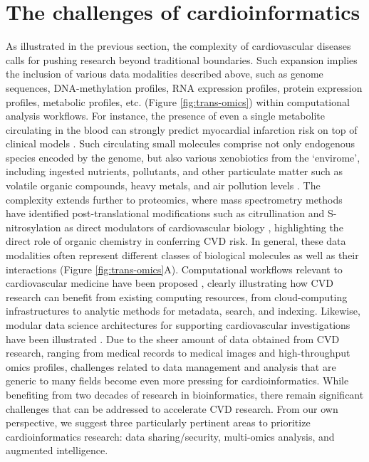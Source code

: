 \documentclass[letter]{bioinfo}
\begin{document}
	\section*{The challenges of cardioinformatics}
	As illustrated in the previous section, the complexity of cardiovascular diseases calls for pushing research beyond traditional boundaries.
	Such expansion implies the inclusion of various data modalities described above, such as genome sequences, DNA-methylation profiles, RNA expression profiles, protein expression profiles, metabolic profiles, etc. (Figure \ref{fig:trans-omics}) within computational analysis workflows.  For instance, the presence of even a single metabolite circulating in the blood can strongly predict myocardial infarction risk on top of clinical models \citep{mcgarrah:2018:cardiovascular}.  Such circulating small molecules comprise not only endogenous species encoded by the genome, but also various xenobiotics from the `envirome', including ingested nutrients, pollutants, and other particulate matter such as volatile organic compounds, heavy metals, and air pollution levels \citep{Lau:2018:Omics,Riggs:2018:Defining,Brook:2010:Particulate}.  The complexity extends further to proteomics, where mass spectrometry methods have identified post-translational modifications such as citrullination and S-nitrosylation as direct modulators of cardiovascular biology \citep{Fert-Bober:2018:Precision}, highlighting the direct role of organic chemistry \citep{McMahon:2017:Survival} in conferring CVD risk.  In general, these data modalities often represent different classes of biological molecules as well as their interactions (Figure \ref{fig:trans-omics}A). Computational workflows relevant to cardiovascular medicine have been proposed \citep{Ping:2018:Biomedical}, clearly illustrating how CVD research can benefit from existing computing resources, from cloud-computing infrastructures to analytic methods for metadata, search, and indexing. Likewise, modular data science architectures for supporting cardiovascular investigations have been illustrated \citep{Khomtchouk:2018:HeartBioPortal,Scruggs:2015:harnessing}.  Due to the sheer amount of data obtained from CVD research, ranging from medical records to medical images and high-throughput omics profiles, challenges related to data management and analysis that are generic to many fields become even more pressing for cardioinformatics. While benefiting from two decades of research in bioinformatics, there remain significant challenges that can be addressed to accelerate CVD research. From our own perspective, we suggest three particularly pertinent areas to prioritize cardioinformatics research: data sharing/security, multi-omics analysis, and augmented intelligence.
	
\end{document}
